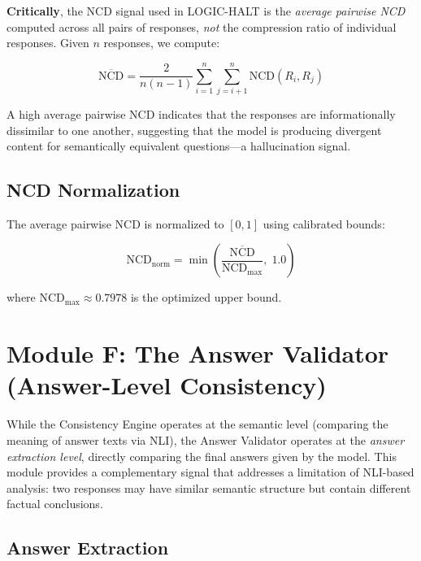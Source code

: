 \textbf{Critically}, the NCD signal used in LOGIC-HALT is the \emph{average pairwise NCD} computed across all pairs of responses, \emph{not} the compression ratio of individual responses. Given $n$ responses, we compute:

\begin{equation}
    \overline{\text{NCD}} = \frac{2}{n(n-1)} \sum_{i=1}^{n} \sum_{j=i+1}^{n} \text{NCD}(R_i, R_j)
    \label{eq:avg_ncd}
\end{equation}

\noindent
A high average pairwise NCD indicates that the responses are informationally dissimilar to one another, suggesting that the model is producing divergent content for semantically equivalent questions---a hallucination signal.

\subsection{NCD Normalization}

The average pairwise NCD is normalized to $[0, 1]$ using calibrated bounds:

\begin{equation}
    \text{NCD}_{\text{norm}} = \min\!\left(\frac{\overline{\text{NCD}}}{\text{NCD}_{\max}}, \; 1.0\right)
\end{equation}

\noindent
where $\text{NCD}_{\max} \approx 0.7978$ is the optimized upper bound.


\section{Module F: The Answer Validator (Answer-Level Consistency)}

While the Consistency Engine operates at the semantic level (comparing the meaning of answer texts via NLI), the Answer Validator operates at the \emph{answer extraction level}, directly comparing the final answers given by the model. This module provides a complementary signal that addresses a limitation of NLI-based analysis: two responses may have similar semantic structure but contain different factual conclusions.

\subsection{Answer Extraction}

